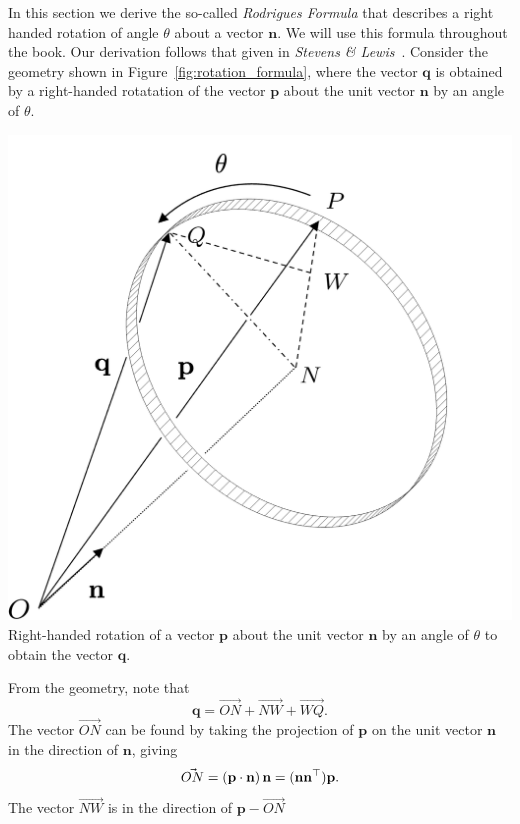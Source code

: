 In this section we derive the so-called {\em Rodrigues Formula} that describes a right handed rotation of angle $\theta$ about a vector $\mathbf{n}$. 
We will use this formula throughout the book. Our derivation
follows that given in {\em Stevens \& Lewis}~\cite{StevensLewis03}.  Consider the geometry shown in Figure~\ref{fig:rotation_formula}, where the vector $\mathbf{q}$ is obtained by a right-handed rotatation of the vector $\mathbf{p}$ about the unit vector $\mathbf{n}$ by an angle of $\theta$. 
%
\begin{marginfigure}[-5in]
  \includegraphics[width=\linewidth]{chap2_preliminaries/figures/rotation_formula}\\
  \caption{Right-handed rotation of a vector $\mathbf{p}$ about the unit
  vector $\mathbf{n}$ by an angle of $\theta$ to obtain the vector $\mathbf{q}$.}
  \label{fig:rotation_formula}
\end{marginfigure}
%
From the geometry, note that 
\begin{equation}\label{eq:frames-rot-formula-prelim}
\mathbf{q} = \vec{ON} + \vec{NW} + \vec{WQ}.
\end{equation}
The vector $\vec{ON}$ can be found by taking the projection of
$\mathbf{p}$ on the unit vector $\mathbf{n}$ in the direction of
$\mathbf{n}$, giving
\[
\vec{ON} = \left(\mathbf{p}\cdot\mathbf{n}\right)\mathbf{n} = (\mathbf{n} \mathbf{n}^\top) \mathbf{p}.
\]
The vector $\vec{NW}$ is in the direction of $\mathbf{p}-\vec{ON}$
